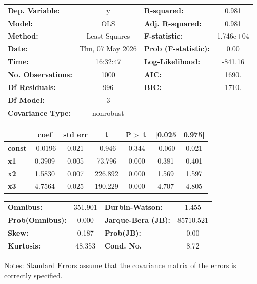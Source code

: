 \begin{center}
\begin{tabular}{lclc}
\toprule
\textbf{Dep. Variable:}    &        y         & \textbf{  R-squared:         } &     0.981   \\
\textbf{Model:}            &       OLS        & \textbf{  Adj. R-squared:    } &     0.981   \\
\textbf{Method:}           &  Least Squares   & \textbf{  F-statistic:       } & 1.746e+04   \\
\textbf{Date:}             & Thu, 07 May 2026 & \textbf{  Prob (F-statistic):} &     0.00    \\
\textbf{Time:}             &     16:32:47     & \textbf{  Log-Likelihood:    } &   -841.16   \\
\textbf{No. Observations:} &        1000      & \textbf{  AIC:               } &     1690.   \\
\textbf{Df Residuals:}     &         996      & \textbf{  BIC:               } &     1710.   \\
\textbf{Df Model:}         &           3      & \textbf{                     } &             \\
\textbf{Covariance Type:}  &    nonrobust     & \textbf{                     } &             \\
\bottomrule
\end{tabular}
\begin{tabular}{lcccccc}
               & \textbf{coef} & \textbf{std err} & \textbf{t} & \textbf{P$> |$t$|$} & \textbf{[0.025} & \textbf{0.975]}  \\
\midrule
\textbf{const} &      -0.0196  &        0.021     &    -0.946  &         0.344        &       -0.060    &        0.021     \\
\textbf{x1}    &       0.3909  &        0.005     &    73.796  &         0.000        &        0.381    &        0.401     \\
\textbf{x2}    &       1.5830  &        0.007     &   226.892  &         0.000        &        1.569    &        1.597     \\
\textbf{x3}    &       4.7564  &        0.025     &   190.229  &         0.000        &        4.707    &        4.805     \\
\bottomrule
\end{tabular}
\begin{tabular}{lclc}
\textbf{Omnibus:}       & 351.901 & \textbf{  Durbin-Watson:     } &     1.455  \\
\textbf{Prob(Omnibus):} &   0.000 & \textbf{  Jarque-Bera (JB):  } & 85710.521  \\
\textbf{Skew:}          &   0.187 & \textbf{  Prob(JB):          } &      0.00  \\
\textbf{Kurtosis:}      &  48.353 & \textbf{  Cond. No.          } &      8.72  \\
\bottomrule
\end{tabular}
\end{center}

Notes: \newline
 [1] Standard Errors assume that the covariance matrix of the errors is correctly specified.